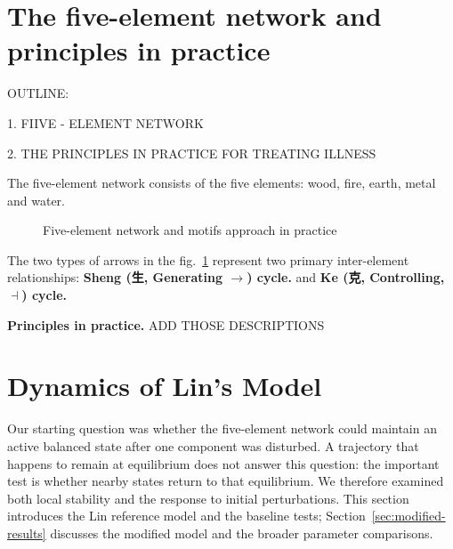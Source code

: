 \documentclass{article}
\begin{document}
\section{The five-element network and principles in practice}

OUTLINE:

1. FIIVE - ELEMENT NETWORK

2. THE PRINCIPLES IN PRACTICE FOR TREATING ILLNESS

The five-element network consists of the five elements: wood, fire, earth, metal and water. 
\begin{figure}[!htb]
\centering
{}

\caption{Five-element network  and motifs approach in practice}
\label{F:WuXing}
\end{figure}
The two types of arrows in the fig.~\ref{F:WuXing} represent two primary inter-element relationships: \textbf{Sheng (生, Generating $\to $) cycle.} and \textbf{Ke (克, Controlling, $\dashv$) cycle.}

{\bf Principles in practice.}
ADD THOSE DESCRIPTIONS

\FloatBarrier
\section{Dynamics of Lin's Model}
\label{sec:lin-results}

Our starting question was whether the five-element network could maintain
an active balanced state after one component was disturbed. A trajectory
that happens to remain at equilibrium does not answer this question: the
important test is whether nearby states return to that equilibrium. We
therefore examined both local stability and the response to initial
perturbations. This section introduces the Lin reference model and the
baseline tests; Section~\ref{sec:modified-results} discusses the modified
model and the broader parameter comparisons.
\end{document}
